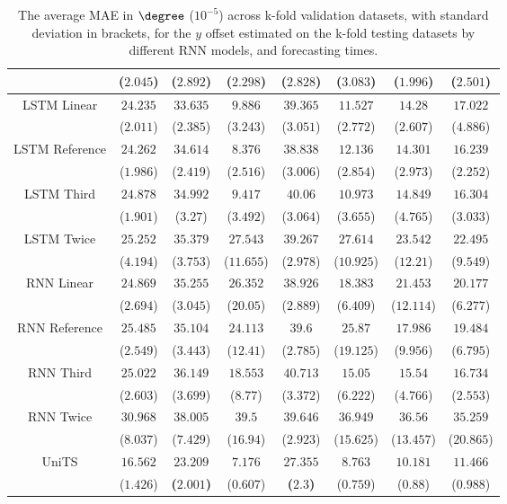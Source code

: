 \begin{table}[!ht]
{\begin{tabular}{|c|c|c|c|c|c|c|c|}
			 & ($2.045$) & ($2.892$) & ($2.298$) & ($2.828$) & ($3.083$) & ($1.996$) & ($2.501$) \\ \hline
			\multirow{2}{*}{LSTM Linear} & $24.235$ & $33.635$ & $9.886$ & $39.365$ & $11.527$ & $14.28$ & $17.022$ \\
			 & ($2.011$) & ($2.385$) & ($3.243$) & ($3.051$) & ($2.772$) & ($2.607$) & ($4.886$) \\ \hline
			\multirow{2}{*}{LSTM Reference} & $24.262$ & $34.614$ & $8.376$ & $38.838$ & $12.136$ & $14.301$ & $16.239$ \\
			 & ($1.986$) & ($2.419$) & ($2.516$) & ($3.006$) & ($2.854$) & ($2.973$) & ($2.252$) \\ \hline
			\multirow{2}{*}{LSTM Third} & $24.878$ & $34.992$ & $9.417$ & $40.06$ & $10.973$ & $14.849$ & $16.304$ \\
			 & ($1.901$) & ($3.27$) & ($3.492$) & ($3.064$) & ($3.655$) & ($4.765$) & ($3.033$) \\ \hline
			\multirow{2}{*}{LSTM Twice} & $25.252$ & $35.379$ & $27.543$ & $39.267$ & $27.614$ & $23.542$ & $22.495$ \\
			 & ($4.194$) & ($3.753$) & ($11.655$) & ($2.978$) & ($10.925$) & ($12.21$) & ($9.549$) \\ \hline
			\multirow{2}{*}{RNN Linear} & $24.869$ & $35.255$ & $26.352$ & $38.926$ & $18.383$ & $21.453$ & $20.177$ \\
			 & ($2.694$) & ($3.045$) & ($20.05$) & ($2.889$) & ($6.409$) & ($12.114$) & ($6.277$) \\ \hline
			\multirow{2}{*}{RNN Reference} & $25.485$ & $35.104$ & $24.113$ & $39.6$ & $25.87$ & $17.986$ & $19.484$ \\
			 & ($2.549$) & ($3.443$) & ($12.41$) & ($2.785$) & ($19.125$) & ($9.956$) & ($6.795$) \\ \hline
			\multirow{2}{*}{RNN Third} & $25.022$ & $36.149$ & $18.553$ & $40.713$ & $15.05$ & $15.54$ & $16.734$ \\
			 & ($2.603$) & ($3.699$) & ($8.77$) & ($3.372$) & ($6.222$) & ($4.766$) & ($2.553$) \\ \hline
			\multirow{2}{*}{RNN Twice} & $30.968$ & $38.005$ & $39.5$ & $39.646$ & $36.949$ & $36.56$ & $35.259$ \\
			 & ($8.037$) & ($7.429$) & ($16.94$) & ($2.923$) & ($15.625$) & ($13.457$) & ($20.865$) \\ \hline
			\multirow{2}{*}{UniTS} & $16.562$ & $\mathbf{23.209}$ & $7.176$ & $\mathbf{27.355}$ & $8.763$ & $10.181$ & $11.466$ \\
			 & ($1.426$) & \textbf{(}$\mathbf{2.001}$\textbf{)} & ($0.607$) & \textbf{(}$\mathbf{2.3}$\textbf{)} & ($0.759$) & ($0.88$) & ($0.988$) \\ \hline
		\end{tabular}
	}
	\caption{The average MAE in $\degree$ ($10^{-5}$) across k-fold validation datasets, with standard deviation in brackets, for the $y$ offset estimated on the k-fold testing datasets by different RNN models, and forecasting times.}
	\label{tab:all_latitude_no_abs_MAE}
\end{table}